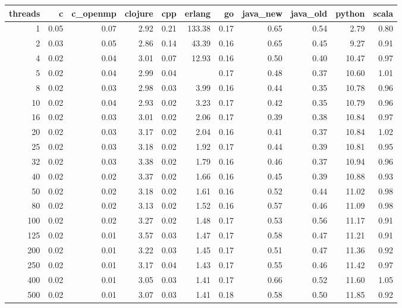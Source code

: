 \begin{table}[ht]
\centering
\begin{tabular}{rrrrrrrrrrr}
  \hline
threads & c & c\_openmp & clojure & cpp & erlang & go & java\_new & java\_old & python & scala \\ 
  \hline
  1 & 0.05 & 0.07 & 2.92 & 0.21 & 133.38 & 0.17 & 0.65 & 0.54 & 2.79 & 0.80 \\ 
    2 & 0.03 & 0.05 & 2.86 & 0.14 & 43.39 & 0.16 & 0.65 & 0.45 & 9.27 & 0.91 \\ 
    4 & 0.02 & 0.04 & 3.01 & 0.07 & 12.93 & 0.16 & 0.50 & 0.40 & 10.47 & 0.97 \\ 
    5 & 0.02 & 0.04 & 2.99 & 0.04 &  & 0.17 & 0.48 & 0.37 & 10.60 & 1.01 \\ 
    8 & 0.02 & 0.03 & 2.98 & 0.03 & 3.99 & 0.16 & 0.44 & 0.35 & 10.78 & 0.96 \\ 
   10 & 0.02 & 0.04 & 2.93 & 0.02 & 3.23 & 0.17 & 0.42 & 0.35 & 10.79 & 0.96 \\ 
   16 & 0.02 & 0.03 & 3.01 & 0.02 & 2.06 & 0.17 & 0.39 & 0.38 & 10.84 & 0.97 \\ 
   20 & 0.02 & 0.03 & 3.17 & 0.02 & 2.04 & 0.16 & 0.41 & 0.37 & 10.84 & 1.02 \\ 
   25 & 0.02 & 0.03 & 3.18 & 0.02 & 1.92 & 0.17 & 0.44 & 0.39 & 10.81 & 0.95 \\ 
   32 & 0.02 & 0.03 & 3.38 & 0.02 & 1.79 & 0.16 & 0.46 & 0.37 & 10.94 & 0.96 \\ 
   40 & 0.02 & 0.02 & 3.37 & 0.02 & 1.66 & 0.16 & 0.45 & 0.39 & 10.88 & 0.93 \\ 
   50 & 0.02 & 0.02 & 3.18 & 0.02 & 1.61 & 0.16 & 0.52 & 0.44 & 11.02 & 0.98 \\ 
   80 & 0.02 & 0.02 & 3.13 & 0.02 & 1.52 & 0.16 & 0.57 & 0.46 & 11.09 & 0.98 \\ 
  100 & 0.02 & 0.02 & 3.27 & 0.02 & 1.48 & 0.17 & 0.53 & 0.56 & 11.17 & 0.91 \\ 
  125 & 0.02 & 0.01 & 3.57 & 0.03 & 1.47 & 0.17 & 0.58 & 0.47 & 11.21 & 0.91 \\ 
  200 & 0.02 & 0.01 & 3.22 & 0.03 & 1.45 & 0.17 & 0.51 & 0.47 & 11.36 & 0.92 \\ 
  250 & 0.02 & 0.01 & 3.17 & 0.04 & 1.43 & 0.17 & 0.55 & 0.46 & 11.42 & 0.97 \\ 
  400 & 0.02 & 0.01 & 3.05 & 0.03 & 1.41 & 0.17 & 0.66 & 0.52 & 11.60 & 1.05 \\ 
  500 & 0.02 & 0.01 & 3.07 & 0.03 & 1.41 & 0.18 & 0.58 & 0.50 & 11.85 & 0.92 \\ 
   \hline
\end{tabular}
\end{table}

